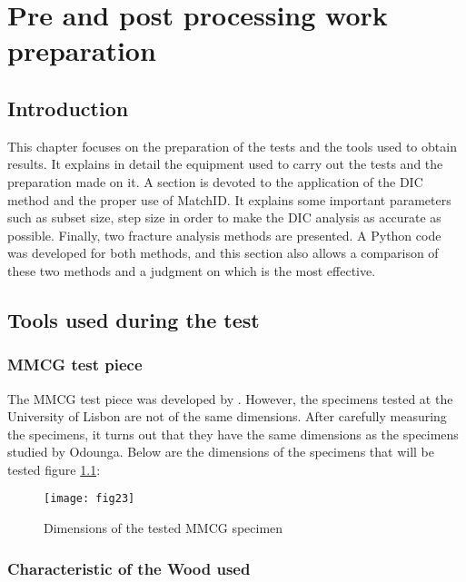 \chapter{Pre and post processing work preparation}
\label{Chapter2}

\section{Introduction}

This chapter focuses on the preparation of the tests and the tools used to obtain results. It explains in detail the equipment used to carry out the tests and the preparation made on it. A section is devoted to the application of the DIC method and the proper use of MatchID. It explains some important parameters such as subset size, step size in order to make the DIC analysis as accurate as possible.
Finally, two fracture analysis methods are presented. A Python code was developed for both methods, and this section also allows a comparison of these two methods and a judgment on which is the most effective.

\section{Tools used during the test}

\subsection{MMCG test piece}

The MMCG test piece was developed by \cite{MoutouPitti2008}. However, the specimens tested at the University of Lisbon are not of the same dimensions. After carefully measuring the specimens, it turns out that they have the same dimensions as the specimens studied by Odounga. Below are the dimensions of the specimens that will be tested figure \ref{fig:fig23}:


\begin{figure}[htp]
	\centering
	\texttt{[image: fig23]}
	\caption{Dimensions of the tested MMCG specimen}
	\label{fig:fig23}
\end{figure}

\subsection{Characteristic of the Wood used}

